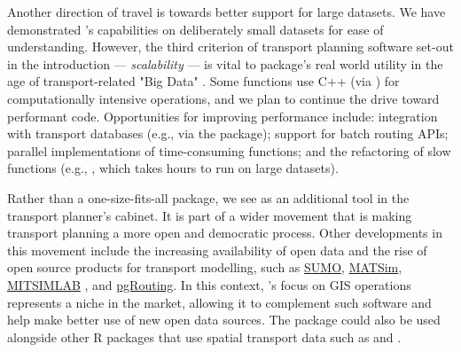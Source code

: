 Another direction of travel is towards better support for large datasets.
We have demonstrated 's capabilities on deliberately small datasets for ease of understanding.
However, the third criterion of transport planning software set-out in the introduction --- \emph{scalability} --- is vital to package's real world utility in the age of transport-related "Big Data" \citep{lovelace_big_2016}.
Some functions use C++ (via ) for computationally intensive operations, and we plan to continue the drive toward performant code.
Opportunities for improving performance include:
integration with transport databases (e.g., via the  package);
support for batch routing APIs;
parallel implementations of time-consuming functions;
and the refactoring of slow functions (e.g., , which takes hours to run on large datasets).


Rather than a one-size-fits-all package, we see  as an additional tool in the transport planner's cabinet.
It is part of a wider movement that is making transport
planning a more open and democratic process. Other developments in this
movement include the increasing availability of open data
\citep{naumova_building_2016} and the rise of open source products for
transport modelling, such as
\href{http://www.dlr.de/ts/en/desktopdefault.aspx/tabid-9883/16931_read-41000/}{SUMO},
\href{http://www.matsim.org/}{MATSim},
\href{https://its.mit.edu/software/mitsimlab}{MITSIMLAB}
\citep{saidallah_comparative_2016}, and
\href{http://pgrouting.org/}{pgRouting}.
In this context, 's focus on
GIS operations represents a niche in the market, allowing it to
complement such software and help make better use of new open data
sources.
The  package could also be used alongside other R packages that
use spatial transport data such as  and
 \citep{RJ-2017-020}.

